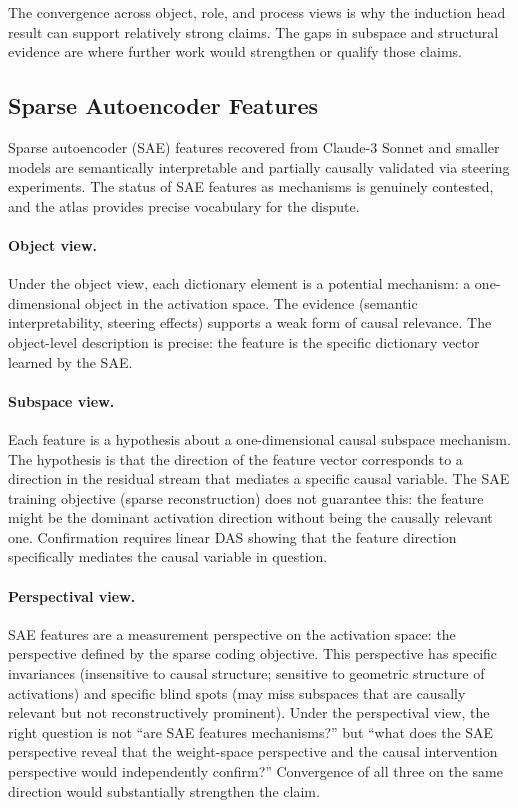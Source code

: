 \documentclass[11pt]{article}
\theoremstyle{remark}
\begin{document}
The convergence across object, role, and process views is why the
induction head result can support relatively strong claims.  The gaps
in subspace and structural evidence are where further work would
strengthen or qualify those claims.

\subsection{Sparse Autoencoder Features}

Sparse autoencoder (SAE) features recovered from Claude-3 Sonnet
\citep{templeton2024} and smaller models \citep{bricken2023} are
semantically interpretable and partially causally validated via steering
experiments.  The status of SAE features as mechanisms is genuinely
contested, and the atlas provides precise vocabulary for the dispute.

\paragraph{Object view.}
Under the object view, each dictionary element is a potential mechanism:
a one-dimensional object in the activation space.  The evidence
(semantic interpretability, steering effects) supports a weak form of
causal relevance.  The object-level description is precise: the feature
is the specific dictionary vector learned by the SAE.

\paragraph{Subspace view.}
Each feature is a hypothesis about a one-dimensional causal subspace
mechanism.  The hypothesis is that the direction of the feature vector
corresponds to a direction in the residual stream that mediates a
specific causal variable.  The SAE training objective (sparse
reconstruction) does not guarantee this: the feature might be the
dominant activation direction without being the causally relevant one.
Confirmation requires linear DAS showing that the feature direction
specifically mediates the causal variable in question.

\paragraph{Perspectival view.}
SAE features are a measurement perspective on the activation space: the
perspective defined by the sparse coding objective.  This perspective
has specific invariances (insensitive to causal structure; sensitive to
geometric structure of activations) and specific blind spots (may
miss subspaces that are causally relevant but not reconstructively
prominent).  Under the perspectival view, the right question is not
``are SAE features mechanisms?'' but ``what does the SAE perspective
reveal that the weight-space perspective and the causal intervention
perspective would independently confirm?''  Convergence of all three
on the same direction would substantially strengthen the claim.
\end{document}
